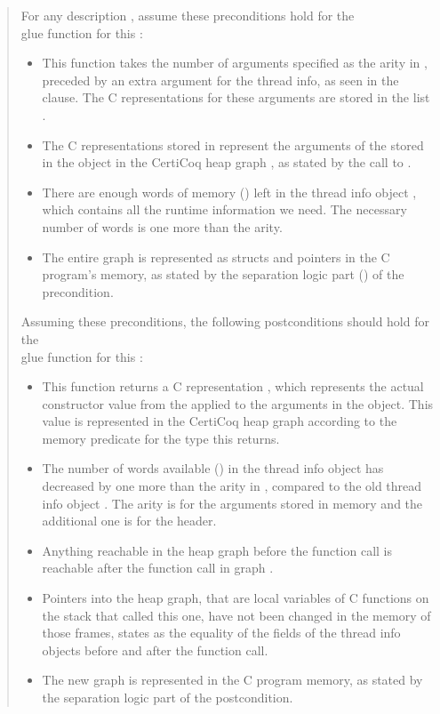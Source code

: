 \begin{quote}
For any \constructor{} description , assume these preconditions hold for the \\ glue function for this \constructor{}:
\begin{itemize}
\item This function takes the number of arguments specified as the arity in , preceded by an extra argument for the \gls{thread info}, as seen in the  clause. The C representations for these arguments are stored in the list .
\item The C representations stored in  represent the arguments of the \constructor{} stored in the \args{} object in the \gls{CertiCoq heap} graph , as stated by the call to \ingraphs{}.
\item There are enough words of memory () left in the \gls{thread info} object , which contains all the runtime information we need. The necessary number of words is one more than the \constructor{} arity.
\item The entire graph  is represented as structs and pointers in the C program's memory, as stated by the separation logic part () of the precondition.
\end{itemize}
Assuming these preconditions, the following postconditions should hold for the \\ glue function for this \constructor{}: 
\begin{itemize}
\item This function returns a C representation , which represents the actual constructor value from the \ctorreflected{} applied to the arguments in the \args{} object. This value is represented in the \gls{CertiCoq heap} graph according to the memory predicate for the type this \constructor{} returns.
\item The number of words available () in the \gls{thread info} object  has decreased by one more than the arity in , compared to the old \gls{thread info} object . The arity is for the arguments stored in memory and the additional one is for the header.
\item Anything reachable in the heap graph  before the function call is reachable after the function call in graph .
\item Pointers into the heap graph, that are local variables of C functions on the stack that called this one, have not been changed in the memory of those frames, states as the equality of the  fields of the \gls{thread info} objects before and after the function call.
\item The new graph  is represented in the C program memory, as stated by the separation logic part of the postcondition.
\end{itemize}
\end{quote}

